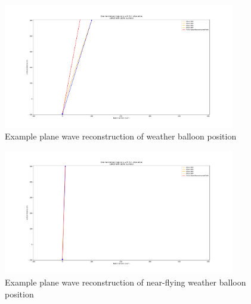 \documentclass[11pt,a4paper,faculty=we,language=en,doctype=report]{cls/ugent-doc}
\begin{document}
\begin{figure}
	\centering
	\includegraphics[width=0.9\textwidth]{WeatherBalloonPositionReconstruction.pdf}
	\caption{Example plane wave reconstruction of weather balloon position}
	\label{fig:WeatherBalloonPositionReconstruction}
\end{figure}
\begin{figure}
	\centering
	\includegraphics[width=0.9\textwidth]{WeatherBalloonClosePositionReconstruction.pdf}
	\caption{Example plane wave reconstruction of near-flying weather balloon position}
	\label{fig:WeatherBalloonClosePositionReconstruction}
\end{figure}
\end{document}
